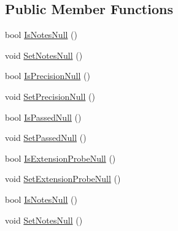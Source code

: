 \subsection*{Public Member Functions}
\begin{DoxyCompactItemize}
\item 
bool \hyperlink{class_env_int_1_1_win32_1_1_field_tech_1_1_manager_1_1_data_sets_1_1_guide_ware_mobile_data_set_1_1_calibration_row_aa095d241b89c38cdf49564aacec2f1ad}{Is\+Notes\+Null} ()
\item 
void \hyperlink{class_env_int_1_1_win32_1_1_field_tech_1_1_manager_1_1_data_sets_1_1_guide_ware_mobile_data_set_1_1_calibration_row_a73bdb4fe465143eb47555612928494b1}{Set\+Notes\+Null} ()
\item 
bool \hyperlink{class_env_int_1_1_win32_1_1_field_tech_1_1_manager_1_1_data_sets_1_1_guide_ware_mobile_data_set_1_1_calibration_row_a3927519d88c2bbb99defd684f96ba7d8}{Is\+Precision\+Null} ()
\item 
void \hyperlink{class_env_int_1_1_win32_1_1_field_tech_1_1_manager_1_1_data_sets_1_1_guide_ware_mobile_data_set_1_1_calibration_row_a4b91060d3869faf24a0039e954f4a07a}{Set\+Precision\+Null} ()
\item 
bool \hyperlink{class_env_int_1_1_win32_1_1_field_tech_1_1_manager_1_1_data_sets_1_1_guide_ware_mobile_data_set_1_1_calibration_row_abacd273932cf26b0e22bafee8b8dcf12}{Is\+Passed\+Null} ()
\item 
void \hyperlink{class_env_int_1_1_win32_1_1_field_tech_1_1_manager_1_1_data_sets_1_1_guide_ware_mobile_data_set_1_1_calibration_row_adb61233f4d8660f6520c77b30a09446d}{Set\+Passed\+Null} ()
\item 
bool \hyperlink{class_env_int_1_1_win32_1_1_field_tech_1_1_manager_1_1_data_sets_1_1_guide_ware_mobile_data_set_1_1_calibration_row_aadc2f9d5381d06f50c90bb2424dcbf87}{Is\+Extension\+Probe\+Null} ()
\item 
void \hyperlink{class_env_int_1_1_win32_1_1_field_tech_1_1_manager_1_1_data_sets_1_1_guide_ware_mobile_data_set_1_1_calibration_row_a3948a7f45790526e1c3ae7cc2a45a753}{Set\+Extension\+Probe\+Null} ()
\item 
bool \hyperlink{class_env_int_1_1_win32_1_1_field_tech_1_1_manager_1_1_data_sets_1_1_guide_ware_mobile_data_set_1_1_calibration_row_aa095d241b89c38cdf49564aacec2f1ad}{Is\+Notes\+Null} ()
\item 
void \hyperlink{class_env_int_1_1_win32_1_1_field_tech_1_1_manager_1_1_data_sets_1_1_guide_ware_mobile_data_set_1_1_calibration_row_a73bdb4fe465143eb47555612928494b1}{Set\+Notes\+Null} ()

\end{DoxyCompactItemize}
